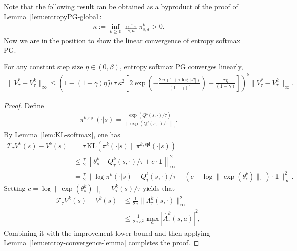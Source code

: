 Note that the following result can be obtained as a byproduct of  the proof of Lemma~\ref{lem:entropyPG-global}:
\begin{align*}
    \kappa:=\inf_{k\geq 0}\min_{s,a}\pi^k_{s,a}>0.
\end{align*}
Now we are in the position to show the linear convergence of entropy softmax PG.
\begin{theorem}\label{thm:entropyPG-linear}
    For any constant step size $\eta\in(0,\beta)$, entropy softmax PG converges linearly,
    \begin{align*}
        \|V_\tau^*-V_\tau^k\|_\infty\leq
        \left(1-(1-\gamma)\eta\,\tilde{\mu}\,\tau\,\kappa^2\left[2\exp\left(-\frac{2\,\eta\,(1+\tau\log|\mathcal{A}|)}{(1-\gamma)^2}\right)-\frac{\tau\,\eta}{(1-\gamma)}\right]\right)^k\|V_\tau^*-V_\tau^k\|_\infty.
    \end{align*}
\end{theorem}
\begin{proof}
Define 
    \begin{align*}
\pi^{k,\mathrm{spi}}(\cdot|s) = \frac{\exp\left(Q^k_\tau(s,\cdot)/\tau\right)}{\|\exp\left(Q^k_\tau(s,\cdot)/\tau\right\|_1}.
\end{align*}
By Lemma~\ref{lem:KL-softmax}, one has
\begin{align*}
\mathcal{T}_\tau V^k(s)-V^k(s) & =\tau\,\mathrm{KL}(\pi^k(\cdot|s)\|\pi^{k,\mathrm{spi}}(\cdot|s))\\
&\leq \frac{\tau}{2}\left\|\theta_s^k-Q^k_\tau(s,\cdot)/\tau+c\cdot \bm{1}\right\|_\infty^2\\
&=\frac{\tau}{2}\|\log\pi^k(\cdot|s)-Q_\tau^k(s,\cdot)/\tau+(c-\log\|\exp(\theta_s^k)\|_1)\cdot \bm{1}\|_\infty^2.
\end{align*}
Setting $c=\log\|\exp(\theta_s^k)\|_1+V_\tau^k(s)/\tau$  yields that 
\begin{align*}
\mathcal{T}_\tau V^k(s)-V^k(s)& \leq \frac{1}{2\,\tau}\|A^k_\tau(s,\cdot)\|_\infty^2\\
&\leq \frac{1}{2\,\tau\,\kappa^2}\max_a|\hat{A}^k_\tau(s,a)|^2, 
\end{align*}
Combining it with the improvement lower bound and then applying Lemma~\ref{lem:entroy-convergence-lemma}
completes the proof.
\end{proof}

